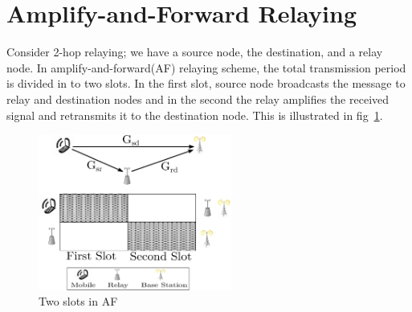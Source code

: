 \documentclass[conference]{IEEEtran}
\begin{document}

%



\section{Amplify-and-Forward Relaying}
Consider 2-hop relaying; we have a source node, the destination, and a relay
node. In amplify-and-forward(AF) relaying scheme, the total transmission period is
divided in to two slots.
In the first slot, source node broadcasts the message to relay and destination nodes
and in the second the relay amplifies the received signal and retransmits it to 
the destination node. This is illustrated in fig~\ref{twoSlots}.
\begin{figure}[!t] 
	\centering 
	\includegraphics[width=2.5in]{img/sysmodel.eps} 
	\caption{Two slots in AF}
	\label{twoSlots} 
\end{figure}
\end{document}
